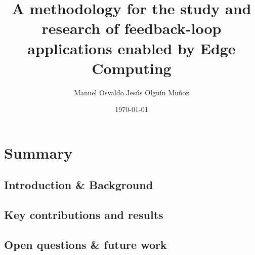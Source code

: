 \documentclass[electronic,oldfontcommands]{kthesis}
\begin{document}
\title{A methodology for the study and research of feedback-loop applications enabled by Edge Computing}
\subtitle{{}}
\author{Manuel {Osvaldo Jesús} {Olguín Muñoz}}
\date{\today}
\address{%
	KTH Royal Institute of Technology\\%
	School of Electrical Engineering and Computer Science\\%
	Division of Information Science and Engineering\\%
	SE-10044 Stockholm\\%
	Sweden%
}

\maketitle

\frontmatter %




\printglossary%


\mainmatter %

\tableofcontents*{}

\part{Summary}\label{part:summary}
\chapter{Introduction \& Background}\label{chap:introduction}



\chapter{Key contributions and results}\label{chap:contributions}


\chapter{Open questions \& future work}

\end{document}
